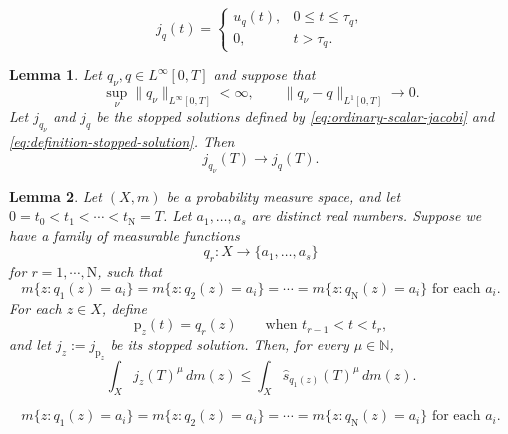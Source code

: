 \documentclass[10pt,a4paper]{amsart}
\newtheorem{lemma}{Lemma}
\begin{document}
\begin{equation}\label{eq:definition-stopped-solution}
j_q(t)=
\begin{cases}
u_q(t), & 0\le t\le \tau_q, \\
0, & t>\tau_q.
\end{cases}
\end{equation}

\begin{lemma}
\label{lem:stopped-continuity}
Let $q_\nu, q\in L^\infty[0, T]$ and suppose that
$$
\sup_\nu\lVert q_\nu\rVert_{L^\infty[0, T]}<\infty, \qquad \lVert q_\nu-q\rVert_{L^1[0, T]}\longrightarrow0.
$$
Let $j_{q_\nu}$ and $j_q$ be the stopped solutions defined by \eqref{eq:ordinary-scalar-jacobi} and \eqref{eq:definition-stopped-solution}. Then
\begin{equation*}\label{eq:stopped-continuity}
j_{q_\nu}(T)\longrightarrow j_q(T).
\end{equation*}
\end{lemma}

\begin{lemma}
\label{lem:finite-valued-integral}
Let $(X, m)$ be a probability measure space, and let $0=t_0<t_1<\cdots<t_{\mathrm{N}}=T$. Let $a_1, \ldots, a_s$ are distinct real numbers. Suppose we have a family of measurable functions
$$q_r:X\longrightarrow\{a_1, \ldots, a_s\}$$
for $r=1, \cdots, {\mathrm{N}}$, such that
\begin{equation}\label{eq:equal-level-measures}
m\{z:q_1(z)=a_i\}=
m\{z:q_2(z)=a_i\}=\cdots=
m\{z:q_{\mathrm{N}}(z)=a_i\} \text{ for each } a_i.
\end{equation}
For each $z\in X$, define
$$
\mathrm{p}_z(t)=q_r(z) \qquad\text{when }t_{r-1}<t<t_r,
$$
and let $j_z:=j_{\mathrm{p}_z}$ be its stopped solution. Then, for every $\mu\in \mathbb { N }$,
\begin{equation}\label{eq:finite-valued-integral}
\int_Xj_z(T)^\mu\, dm(z)
\le \int_X\widehat s_{q_1(z)}(T)^\mu\, dm(z).
\end{equation}
\end{lemma}

\begin{equation}
m\{z:q_1(z)=a_i\}=
m\{z:q_2(z)=a_i\}=\cdots=
m\{z:q_{\mathrm{N}}(z)=a_i\} \text{ for each } a_i.
\end{equation}
\end{document}
